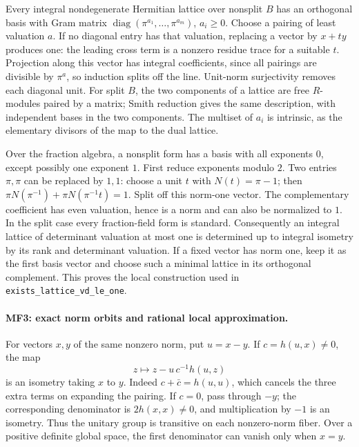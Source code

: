 Every integral nondegenerate Hermitian lattice over nonsplit \(B\)
has an orthogonal basis with Gram matrix
\(\operatorname{diag}(\pi^{a_1},\ldots,\pi^{a_m})\), \(a_i\ge0\).
Choose a pairing of least valuation \(a\).
If no diagonal entry has that valuation, replacing a vector by
\(x+t y\) produces one: the leading cross term is a nonzero residue
trace for a suitable \(t\). Projection along this vector has integral
coefficients, since all pairings are divisible by \(\pi^a\), so
induction splits off the line. Unit-norm surjectivity removes each
diagonal unit. For split \(B\), the two components of a lattice are
free \(R\)-modules paired by a matrix; Smith reduction gives the same
description, with independent bases in the two components.
The multiset of \(a_i\) is intrinsic, as the elementary divisors of
the map to the dual lattice.

Over the fraction algebra, a nonsplit form has a basis with all
exponents \(0\), except possibly one exponent \(1\).
First reduce exponents modulo \(2\). Two entries \(\pi,\pi\)
can be replaced by \(1,1\): choose a unit \(t\) with
\(N(t)=\pi-1\); then
\(\pi N(\pi^{-1})+\pi N(\pi^{-1}t)=1\).
Split off this norm-one vector. The complementary coefficient has
even valuation, hence is a norm and can also be normalized to \(1\).
In the split case every fraction-field form is standard.
Consequently an integral lattice of determinant valuation at most
one is determined up to integral isometry by its rank and determinant
valuation. If a fixed vector has norm one, keep it as the first
basis vector and choose such a minimal lattice in its orthogonal
complement. This proves the local construction used in
\texttt{exists\_lattice\_vd\_le\_one}.

\paragraph{MF3: exact norm orbits and rational local approximation.}
For vectors \(x,y\) of the same nonzero norm, put \(u=x-y\).
If \(c=h(u,x)\ne0\), the map
\[
             z\longmapsto z-u\,c^{-1}h(u,z)            \tag{MF.4}
\]
is an isometry taking \(x\) to \(y\). Indeed
\(c+\bar c=h(u,u)\), which cancels the three extra terms on
expanding the pairing. If \(c=0\), pass through \(-y\);
the corresponding denominator is \(2h(x,x)\ne0\), and multiplication
by \(-1\) is an isometry. Thus the unitary group is transitive on
each nonzero-norm fiber. Over a positive definite global space,
the first denominator can vanish only when \(x=y\).

